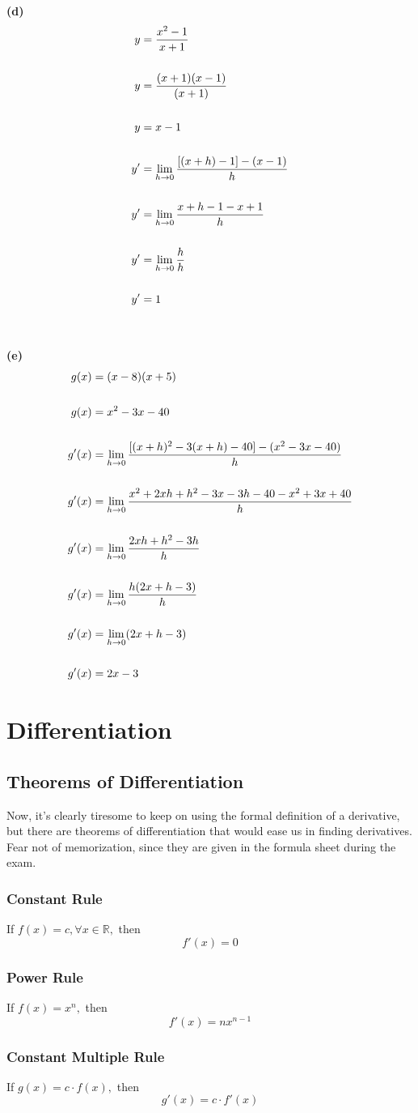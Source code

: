 \documentclass[hidelinks, a4paper, 12pt]{article}
\newcommand{\bd}{\textbf}
\newcommand{\n}{\\[\baselineskip]}
\newcommand{\real}{\mathbb{R}}
\begin{document}
                \n\bd{(d)}
                \[\begin{split}
                    y &= \frac{x^2-1}{x+1}\n
                    y &= \frac{(x+1)(x-1)}{(x+1)}\n
                    y &= x-1\n
                    y' &= \lim_{h\to0}\frac{[(x+h)-1] - (x-1)}{h}\n 
                    y' &= \lim_{h\to0}\frac{x+h-1 -x+1}{h}\n 
                    y' &= \lim_{h\to0}\frac{h}{h}\n 
                    y' &= 1\n 
                \end{split}\]
                \n\bd{(e)}
                \[\begin{split}
                    g(x) &= (x-8)(x+5)\n
                    g(x) &= x^2-3x-40\n
                    g'(x) &= \lim_{h\to0}\frac{[(x+h)^2-3(x+h)-40] - (x^2-3x-40)}{h}\n 
                    g'(x) &= \lim_{h\to0}\frac{x^2+2xh+h^2-3x-3h-40-x^2+3x+40}{h}\n 
                    g'(x) &= \lim_{h\to0}\frac{2xh+h^2-3h}{h}\n 
                    g'(x) &= \lim_{h\to0}\frac{h(2x+h-3)}{h}\n 
                    g'(x) &= \lim_{h\to0}(2x+h-3)\n 
                    g'(x) &= 2x-3       
                \end{split}\]
    
    \section{Differentiation}
        \subsection{Theorems of Differentiation}
            Now, it's clearly tiresome to keep on using the formal definition of a derivative, but there are theorems of differentiation
            that would ease us in finding derivatives. Fear not of memorization, since they are given in the formula sheet during the exam.
            \subsubsection{Constant Rule}
                If $f(x) = c, \forall x \in \real,$ then
                \[f'(x) = 0\]
            \subsubsection{Power Rule}
                If $f(x) = x^n,$ then
                \[f'(x) = nx^{n-1}\]
            \subsubsection{Constant Multiple Rule}
                If $g(x) = c\cdot f(x),$ then
                \[g'(x) = c\cdot f'(x)\]
\end{document}
